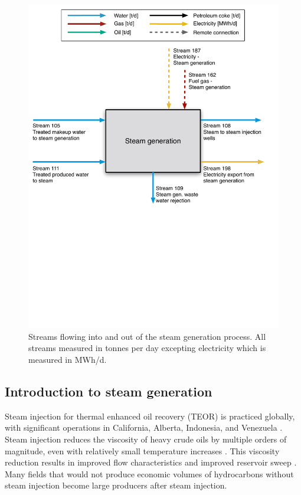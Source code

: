 \documentclass[11pt]{report}
\begin{document}
\begin{figure}
\includegraphics[width=0.85\columnwidth]{images/steam_generation_PF.pdf}
\caption{Streams flowing into and out of the steam generation process. All streams measured in tonnes per day excepting electricity which is measured in MWh/d.}
\label{fig:steam_generation_PF}
\end{figure}


\subsection{Introduction to steam generation}

Steam injection for thermal enhanced oil recovery (TEOR) is practiced globally, with significant operations in California, Alberta, Indonesia, and Venezuela \cite{Moritis2010}. Steam injection reduces the viscosity of heavy crude oils by multiple orders of magnitude, even with relatively small temperature increases \cite{Baibakov1989, Brandt2010, Donaldson1989, Prats1985, Green1998}. This viscosity reduction results in improved flow characteristics and improved reservoir sweep \cite{Green1998}. Many fields that would not produce economic volumes of hydrocarbons without steam injection become large producers after steam injection.
\end{document}
